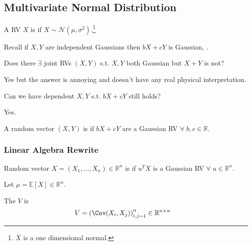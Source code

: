\subsection{Multivariate Normal Distribution}
\begin{definition}[Gaussian RV]
    A RV $X$ is  if $X \sim \mathcal{N}(\mu, \sigma^2)$.\footnote{$X$ is a one dimensional normal.}
\end{definition} 

Recall if $X, Y$ are independent Gaussians then $bX + cY$ is Gaussian, .

\begin{question}
    Does there $\exists$ joint RVs $(X, Y)$ s.t. $X, Y$ both Gaussian but $X + Y$ is not?
\end{question} 

\begin{answer}
    Yes but the answer is annoying and doesn't have any real physical interpretation.
\end{answer} 

\begin{question}
    Can we have dependent $X, Y$ s.t. $bX + cY$ still holds?
\end{question} 

\begin{answer}
    Yes.
\end{answer} 

\begin{definition}
    A random vector $(X, Y)$ is  if $bX + cY$ are a Gaussian RV $\forall \; b, c \in \mathbb{R}$.
\end{definition} 

\subsubsection{Linear Algebra Rewrite}

\begin{definition}
    Random vector $X = (X_1, \dots, X_n) \in \mathbb{R}^n$ is  if $u^T X$ is a Gaussian RV $\forall \; u \in \mathbb{R}^n$.
\end{definition} 

Let $\mu = \mathbb{E}[X] \in \mathbb{R}^n$.

\begin{definition}
    The  $V$ is
    \begin{align*}
        V &= \left( \Cov(X_i, X_j) \right)_{i, j = 1}^n \in \mathbb{R}^{n \times n}
    \end{align*} 
\end{definition} 

